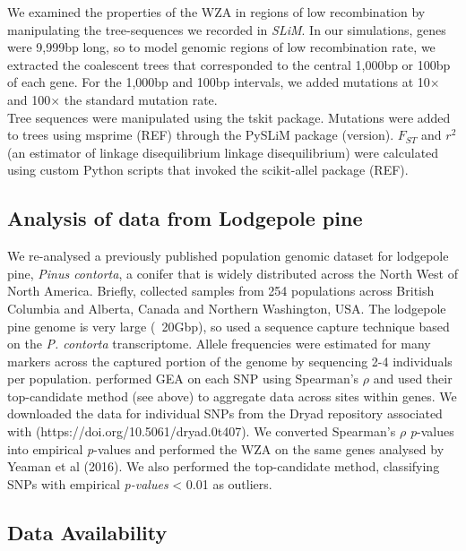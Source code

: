 \documentclass[10pt,twoside,lineno]{GSA_format}
\begin{document}
We examined the properties of the WZA in regions of low recombination by manipulating the tree-sequences we recorded in \textit{SLiM}. In our simulations, genes were 9,999bp long, so to model genomic regions of low recombination rate, we extracted the coalescent trees that corresponded to the central 1,000bp or 100bp of each gene. For the 1,000bp and 100bp intervals, we added mutations at 10$\times$ and 100$\times$ the standard mutation rate. \\

Tree sequences were manipulated using the tskit package. Mutations were added to trees using msprime (REF) through the PySLiM package (version). $F_{ST}$ and $r^2$ (an estimator of linkage disequilibrium linkage disequilibrium) were calculated using custom Python scripts that invoked the scikit-allel package (REF).\\



\subsection{Analysis of data from Lodgepole pine}

We re-analysed a previously published population genomic dataset for lodgepole pine, \textit{Pinus contorta}, a conifer that is widely distributed across the North West of North America. Briefly, \cite{Yeaman2016} collected samples from 254 populations across British Columbia and Alberta, Canada and Northern Washington, USA. The lodgepole pine genome is very large (~20Gbp), so \cite{Yeaman2016} used a sequence capture technique based on the \textit{P. contorta} transcriptome. Allele frequencies were estimated for many markers across the captured portion of the genome by sequencing 2-4 individuals per population. \cite{Yeaman2016} performed GEA on each SNP using Spearman's $\rho$ and used their top-candidate method (see above) to aggregate data across sites within genes. We downloaded the data for individual SNPs from the Dryad repository associated with \cite{Yeaman2016} (https://doi.org/10.5061/dryad.0t407). We converted Spearman's $\rho$ \textit{p}-values into empirical \textit{p}-values and performed the WZA on the same genes analysed by Yeaman et al (2016). We also performed the top-candidate method, classifying SNPs with empirical \textit{p-values} < 0.01 as outliers. 

\subsection{Data Availability}
\end{document}
